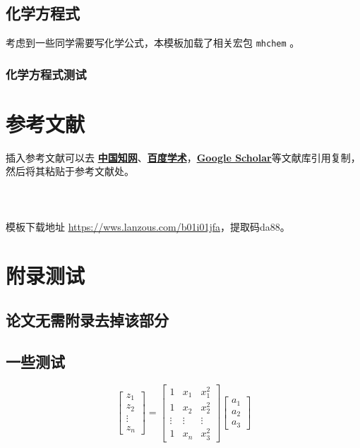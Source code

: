 \documentclass{imutthesis}
\begin{document}
\subsection{化学方程式}
考虑到一些同学需要写化学公式，本模板加载了相关宏包 \verb|mhchem| 。
\subsubsection{化学方程式测试}
\section{参考文献}
插入参考文献可以去\cite{YYQD201807001} \href{https://www.cnki.net/}{\textbf{中国知网}}、\href{https://xueshu.baidu.com/}{\textbf{百度学术}}，\href{https://scholar.google.com/}{\textbf{Google Scholar}}等文献库引用复制，然后将其粘贴于参考文献处。
~\\~\\~\\~\\

{模板下载地址 \url{https://wws.lanzous.com/b01i01jfa}，提取码da88。}\cite{YYQD201807001}





\appendix
\section{附录测试}
\subsection{论文无需附录去掉该部分}

\subsection{一些测试}
\begin{equation} 
\begin{bmatrix}
	z_{1}\\
	z_{2}\\
	\vdots\\
	z_{n}
\end{bmatrix}
=\begin{bmatrix}
	1 & x_{1}  &x_{1}^{2}  \\
	1& x_{2} & x_{2}^{2} \\
	\vdots & \vdots & \vdots\\
	1 & x_{n} & x_{3}^{2}
\end{bmatrix}
\begin{bmatrix}
	a_{1} \\
	a_{2} \\
	a_{3} 
\end{bmatrix}
\end{equation}
\end{document}
